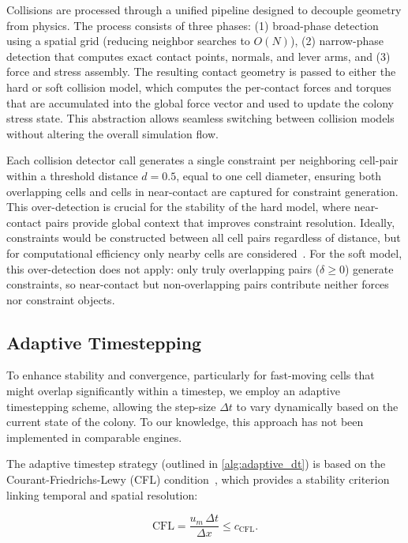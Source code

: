\documentclass[a4paper,fleqn]{cas-dc}
\begin{document}
Collisions are processed through a unified pipeline designed to decouple geometry from physics. The process consists of three phases: (1) broad-phase detection using a spatial grid (reducing neighbor searches to $O(N)$), (2) narrow-phase detection that computes exact contact points, normals, and lever arms, and (3) force and stress assembly. The resulting contact geometry is passed to either the hard or soft collision model, which computes the per-contact forces and torques that are accumulated into the global force vector and used to update the colony stress state. This abstraction allows seamless switching between collision models without altering the overall simulation flow.

Each collision detector call generates a single constraint per neighboring cell-pair within a threshold distance $d = 0.5$, equal to one cell diameter, ensuring both overlapping cells and cells in near-contact are captured for constraint generation. This over-detection is crucial for the stability of the hard model, where near-contact pairs provide global context that improves constraint resolution. Ideally, constraints would be constructed between all cell pairs regardless of distance, but for computational efficiency only nearby cells are considered~\cite{Yan2019, Yan2022,Yan_2020}. For the soft model, this over-detection does not apply: only truly overlapping pairs ($\delta \geq 0$) generate constraints, so near-contact but non-overlapping pairs contribute neither forces nor constraint objects.

\subsection{Adaptive Timestepping}

To enhance stability and convergence, particularly for fast-moving cells that might overlap significantly within a timestep, we employ an adaptive timestepping scheme, allowing the step-size $\Delta t$ to vary dynamically based on the current state of the colony. To our knowledge, this approach has not been implemented in comparable engines.

The adaptive timestep strategy (outlined in \autoref{alg:adaptive_dt}) is based on the Courant-Friedrichs-Lewy (CFL) condition~\cite{Courant1928}, which provides a stability criterion linking temporal and spatial resolution:

\begin{equation}
    \text{CFL} = \frac{u_m \, \Delta t}{\Delta x} \leq c_{\mathrm{CFL}}.
\end{equation}
\end{document}
